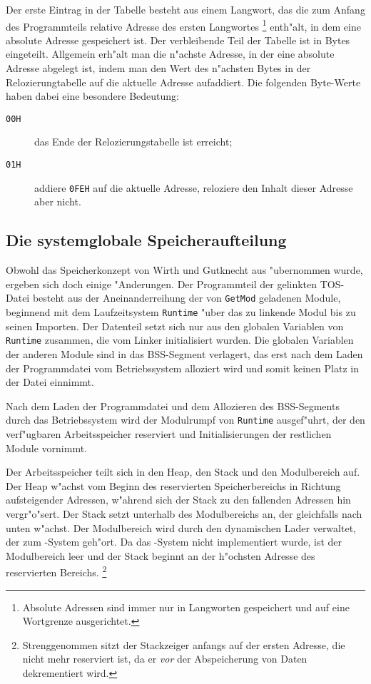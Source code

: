 Der erste Eintrag in der Tabelle besteht aus einem Langwort, das die
zum Anfang des Programmteils relative Adresse des ersten Langwortes%
\footnote{Absolute Adressen sind immer nur in Langworten gespeichert
und auf eine Wortgrenze ausgerichtet.}
enth"alt, in dem eine absolute Adresse gespeichert ist.
Der verbleibende Teil der Tabelle ist in Bytes eingeteilt.
Allgemein erh"alt man die n"achste Adresse, in der eine absolute Adresse abgelegt
ist, indem man den Wert des n"achsten Bytes in der Relozierungtabelle auf die
aktuelle Adresse aufaddiert.
Die folgenden Byte-Werte haben dabei eine besondere Bedeutung:
\begin{description}
\item[{\tt 00H}] das Ende der Relozierungstabelle ist erreicht;
\item[{\tt 01H}] addiere {\tt 0FEH} auf die aktuelle Adresse, reloziere
  den Inhalt dieser Adresse aber nicht.
\end{description}


\subsection{Die systemglobale Speicheraufteilung}

Obwohl das Speicherkonzept von Wirth und Gutknecht aus \cite[S.~867]{oberonSystem}
"ubernommen wurde, ergeben sich doch einige "Anderungen.
Der Programmteil der gelinkten TOS-Datei besteht aus der Aneinanderreihung
der von {\tt GetMod} geladenen Module, beginnend mit dem Laufzeitsystem {\tt Runtime}
"uber das zu linkende Modul bis zu seinen Importen.
Der Datenteil setzt sich nur aus den globalen Variablen von {\tt Runtime}
zusammen, die vom Linker initialisiert wurden.
Die globalen Variablen der anderen Module sind in das BSS-Segment verlagert,
das erst nach dem Laden der Programmdatei vom Betriebssystem alloziert wird und
somit keinen Platz in der Datei einnimmt.

Nach dem Laden der Programmdatei und dem Allozieren des BSS-Segments durch das
Betriebssystem wird der Modulrumpf von {\tt Runtime} ausgef"uhrt, der
den verf"ugbaren Arbeitsspeicher reserviert und Initialisierungen
der restlichen Module vornimmt.

Der Arbeitsspeicher teilt sich in den Heap, den Stack und den Modulbereich auf.
Der Heap w"achst vom Beginn des reservierten Speicherbereichs in Richtung
aufsteigender Adressen, w"ahrend sich der Stack zu den fallenden Adressen hin
vergr"o"sert.
Der Stack setzt unterhalb des Modulbereichs an, der gleichfalls nach unten
w"achst.
Der Modulbereich wird durch den dynamischen Lader verwaltet, der zum \oberon-System
geh"ort.
Da das \oberon-System nicht implementiert wurde, ist der Modulbereich leer und
der Stack beginnt an der h"ochsten Adresse des reservierten Bereichs.%
\footnote{Strenggenommen sitzt der Stackzeiger anfangs auf der ersten Adresse,
die nicht mehr reserviert ist, da er {\em vor\/} der Abspeicherung von Daten dekrementiert
wird.}

